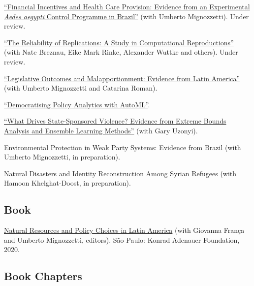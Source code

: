 \documentclass[a4paper]{article}
\renewenvironment{itemize}{
	\begin{list}{}{
			\setlength{\leftmargin}{1.5em}
		}
		}{
	\end{list}
}
\begin{document}
\begin{itemize}
\item \href{https://github.com/danilofreire/incentives-healthcare}{``Financial Incentives and Health Care Provision: Evidence from an Experimental \textit{Aedes aegypti} Control Programme in Brazil''} (with Umberto Mignozzetti). Under review.
\item \href{https://osf.io/preprints/socarxiv/j7qta}{``The Reliability of Replications: A Study in Computational
Reproductions''} (with Nate Breznau, Eike Mark Rinke, Alexander Wuttke and others). Under review.
\item \href{https://github.com/danilofreire/danilofreire.github.io/blob/master/malapportionment.pdf}{``Legislative Outcomes and Malapportionment: Evidence from Latin America''} (with Umberto Mignozzetti and Catarina Roman).
\item \href{https://github.com/danilofreire/mercatus-analytics-papers/blob/main/automl-paper/automl.pdf}{``Democratising Policy Analytics with AutoML''}.
\item \href{https://osf.io/pzx3q}{``What Drives State-Sponsored Violence? Evidence from Extreme Bounds Analysis and Ensemble Learning Methods''} (with Gary Uzonyi).
\item Environmental Protection in Weak Party Systems: Evidence from Brazil (with Umberto Mignozzetti, in preparation).
\item Natural Disasters and Identity Reconstruction Among Syrian Refugees (with Hamoon Khelghat-Doost, in preparation).
\end{itemize}

\subsection*{Book}

\begin{itemize}
\item \href{https://github.com/danilofreire/danilofreire.github.io/blob/01dc4c9566bb5ade15b5db950046ed0a386fc5f1/texts/natural_resources_policy_choices_latam.pdf}{Natural Resources and Policy Choices in Latin America} (with Giovanna França and Umberto Mignozzetti, editors). São Paulo: Konrad Adenauer Foundation, 2020.
\end{itemize}

\subsection*{Book Chapters}
\end{document}
